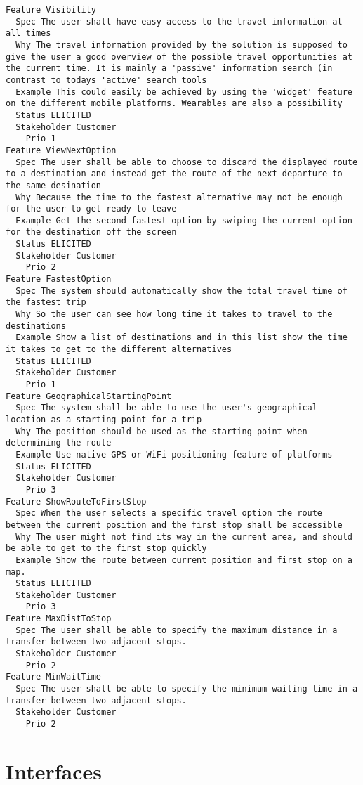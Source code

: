 \begin{lstlisting}
Feature Visibility
  Spec The user shall have easy access to the travel information at all times
  Why The travel information provided by the solution is supposed to give the user a good overview of the possible travel opportunities at the current time. It is mainly a 'passive' information search (in contrast to todays 'active' search tools
  Example This could easily be achieved by using the 'widget' feature on the different mobile platforms. Wearables are also a possibility
  Status ELICITED
  Stakeholder Customer
    Prio 1
Feature ViewNextOption
  Spec The user shall be able to choose to discard the displayed route to a destination and instead get the route of the next departure to the same desination
  Why Because the time to the fastest alternative may not be enough for the user to get ready to leave
  Example Get the second fastest option by swiping the current option for the destination off the screen
  Status ELICITED
  Stakeholder Customer
    Prio 2
Feature FastestOption
  Spec The system should automatically show the total travel time of the fastest trip
  Why So the user can see how long time it takes to travel to the destinations
  Example Show a list of destinations and in this list show the time it takes to get to the different alternatives
  Status ELICITED
  Stakeholder Customer
    Prio 1
Feature GeographicalStartingPoint
  Spec The system shall be able to use the user's geographical location as a starting point for a trip
  Why The position should be used as the starting point when determining the route
  Example Use native GPS or WiFi-positioning feature of platforms
  Status ELICITED
  Stakeholder Customer
    Prio 3
Feature ShowRouteToFirstStop
  Spec When the user selects a specific travel option the route between the current position and the first stop shall be accessible
  Why The user might not find its way in the current area, and should be able to get to the first stop quickly
  Example Show the route between current position and first stop on a map.
  Status ELICITED
  Stakeholder Customer
    Prio 3
Feature MaxDistToStop
  Spec The user shall be able to specify the maximum distance in a transfer between two adjacent stops.
  Stakeholder Customer
    Prio 2
Feature MinWaitTime
  Spec The user shall be able to specify the minimum waiting time in a transfer between two adjacent stops.
  Stakeholder Customer
    Prio 2

\end{lstlisting}
    
        
       \section{Interfaces}


